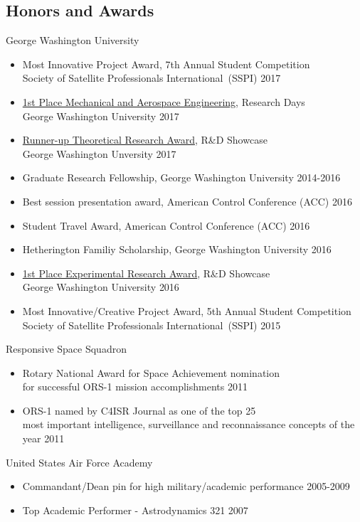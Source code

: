\subsection*{Honors and Awards} %
{}

George Washington University
\begin{itemize}
    \item {Most Innovative Project Award, 7th Annual Student Competition \\ 
    Society of Satellite Professionals International~(SSPI) } \hfill {2017}  
    \item {\href{http://researchdays.gwu.edu}{1st Place Mechanical and Aerospace Engineering}, Research Days\\George Washington University} \hfill {2017} 
    \item {\href{https://www.seas.gwu.edu/RDshowcase}{Runner-up Theoretical Research Award}, R\&D Showcase\\George Washington Unversity} \hfill {2017}
    \item Graduate Research Fellowship, George Washington University \hfill {2014-2016}
    \item Best session presentation award, American Control Conference (ACC) \hfill {2016}
    \item Student Travel Award, American Control Conference (ACC) \hfill {2016}
    \item Hetherington Familiy Scholarship, George Washington University \hfill {2016}
    \item {\href{1https://www.seas.gwu.edu/student-research-development-winners-year#2016}{1st Place Experimental Research Award}, R\&D Showcase\\ George Washington University} \hfill {2016}
    \item {Most Innovative/Creative Project Award, 5th Annual Student Competition \\ 
    Society of Satellite Professionals International~(SSPI) } \hfill {2015}  
\end{itemize}

Responsive Space Squadron
\begin{itemize}
    \item Rotary National Award for Space Achievement nomination \\
    for successful ORS-1 mission accomplishments \hfill {2011} 
    \item ORS-1 named by C4ISR Journal as one of the top 25\\
     most important intelligence, surveillance and reconnaissance concepts of the year \hfill {2011}
\end{itemize}

United States Air Force Academy
\begin{itemize}
\item Commandant/Dean pin for high military/academic performance \hfill {2005-2009}
\item Top Academic Performer - Astrodynamics 321 \hfill {2007}
\end{itemize}
